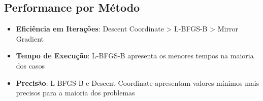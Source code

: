 \documentclass[12pt]{article}
\begin{document}
\subsection{Performance por Método}

\begin{itemize}
\item \textbf{Eficiência em Iterações}: Descent Coordinate > L-BFGS-B > Mirror Gradient
\item \textbf{Tempo de Execução}: L-BFGS-B apresenta os menores tempos na maioria dos casos
\item \textbf{Precisão}: L-BFGS-B e Descent Coordinate apresentam valores mínimos mais precisos para a maioria dos problemas
\end{itemize}
\end{document}
